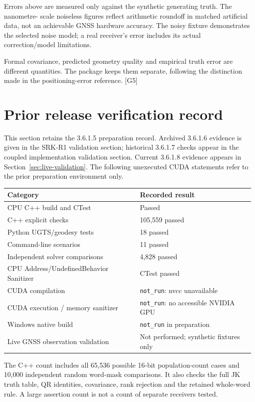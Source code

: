 \documentclass[11pt,a4paper]{article}
\newcommand{\code}[1]{\texttt{#1}}
\newcommand{\ext}[1]{\textcolor{muted}{[#1]}}
\begin{document}
Errors above are measured only against the synthetic generating truth. The nanometre-
scale noiseless figures reflect arithmetic roundoff in matched artificial data, not
an achievable GNSS hardware accuracy. The noisy fixture demonstrates the selected
noise model; a real receiver's error includes its actual correction/model limitations.

Formal covariance, predicted geometry quality and empirical truth error are different
quantities. The package keeps them separate, following the distinction made in the
positioning-error reference. \ext{G5}
\clearpage

\section{Prior release verification record}
This section retains the 3.6.1.5 preparation record. Archived 3.6.1.6 evidence
is given in the SRK-R1 validation section; historical 3.6.1.7 checks appear in the
coupled implementation validation section. Current 3.6.1.8 evidence appears in
Section~\ref{sec:live-validation}. The following unexecuted
CUDA statements refer to the prior preparation environment only.

\begin{center}
\begin{tabularx}{\textwidth}{@{}P{.48\textwidth}Y@{}}\toprule
\textbf{Category} & \textbf{Recorded result}\\\midrule
CPU C++ build and CTest & Passed\\
C++ explicit checks & 105,559 passed\\
Python UGTS/geodesy tests & 18 passed\\
Command-line scenarios & 11 passed\\
Independent solver comparisons & 4,828 passed\\
CPU Address/UndefinedBehavior Sanitizer & CTest passed\\
CUDA compilation & \code{not\_run}: nvcc unavailable\\
CUDA execution / memory sanitizer & \code{not\_run}: no accessible NVIDIA GPU\\
Windows native build & \code{not\_run} in preparation\\
Live GNSS observation validation & Not performed; synthetic fixtures only\\\bottomrule
\end{tabularx}
\end{center}

The C++ count includes all 65,536 possible 16-bit population-count cases and 10,000
independent random word-mask comparisons. It also checks the full JK truth table,
QR identities, covariance, rank rejection and the retained whole-word rule. A large
assertion count is not a count of separate receivers tested.
\end{document}
